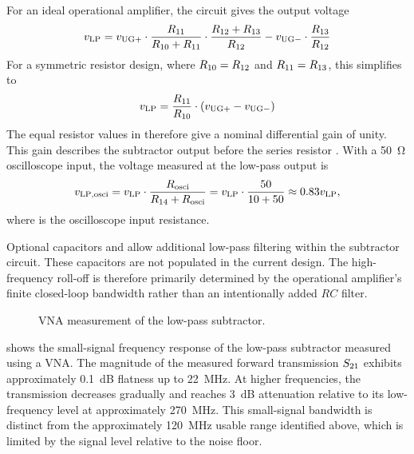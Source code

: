 For an ideal operational amplifier, the circuit gives the output voltage
\begin{equation}
	{v}_{\mathrm{LP}} = {v}_{\mathrm{UG+}}\cdot\frac{{R}_{\mathrm{11}}}{{R}_{\mathrm{10}}+{R}_{\mathrm{11}}}\cdot\frac{{R}_{\mathrm{12}}+{R}_{\mathrm{13}}}{{R}_{\mathrm{12}}} - {v}_{\mathrm{UG-}}\cdot\frac{{R}_{\mathrm{13}}}{{R}_{\mathrm{12}}} 
\end{equation}
For a symmetric resistor design, where ${R}_{\mathrm{10}} = {R}_{\mathrm{12}}$ and ${R}_{\mathrm{11}} = {R}_{\mathrm{13}}$, this simplifies to
\begin{equation}
	{v}_{\mathrm{LP}} = \frac{{R}_{\mathrm{11}}}{{R}_{\mathrm{10}}} \cdot ({v}_{\mathrm{UG+}} - {v}_{\mathrm{UG-}})
\end{equation}
The equal resistor values in  therefore give a nominal differential gain of unity.
This gain describes the subtractor output before the series resistor .
With a \SI{50}{\ohm} oscilloscope input, the voltage measured at the low-pass output is
\begin{equation}
	{v}_{\mathrm{LP,osci}} = {v}_{\mathrm{LP}}\cdot\frac{{R}_{\mathrm{osci}}}{{R}_{\mathrm{14}}+{R}_{\mathrm{osci}}} = {v}_{\mathrm{LP}}\cdot\frac{50}{10+50} \approx 0.83{v}_{\mathrm{LP}},
\end{equation}
where  is the oscilloscope input resistance.

Optional capacitors  and  allow additional low-pass filtering within the subtractor circuit.
These capacitors are not populated in the current design.
The high-frequency roll-off is therefore primarily determined by the operational amplifier's finite closed-loop bandwidth rather than an intentionally added $RC$ filter.



\begin{figure}[ht]
	\centering
	
	\caption{VNA measurement of the low-pass subtractor.}\label{fig:VNA_rawLP}
\end{figure}

 shows the small-signal frequency response of the low-pass subtractor measured using a VNA.
The magnitude of the measured forward transmission ${S}_{\mathrm{21}}$ exhibits approximately \SI{0.1}{dB} flatness up to \SI{22}{MHz}.
At higher frequencies, the transmission decreases gradually and reaches \SI{3}{dB} attenuation relative to its low-frequency level at approximately \SI{270}{MHz}.
This small-signal bandwidth is distinct from the approximately \SI{120}{MHz} usable range identified above, which is limited by the signal level relative to the noise floor.





